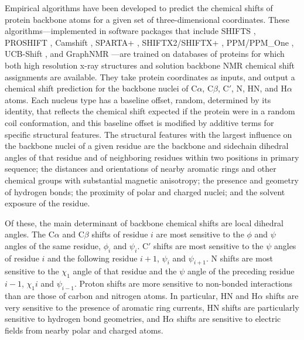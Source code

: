 \documentclass[9pt,review]{livecoms}
\begin{document}
Empirical algorithms have been developed to predict the chemical shifts of protein backbone atoms for a given set of three-dimensional coordinates.
These algorithms---implemented in software packages that include SHIFTS \cite{xu_automated_2001}, PROSHIFT \cite{meiler_proshift_2003}, Camshift \cite{kohlhoff_fast_2009}, SPARTA+ \cite{shen_sparta_2010}, SHIFTX2/SHIFTX+ \cite{han_shiftx2_2011}, PPM/PPM\_One \cite{li_ppm_2012,li_ppm_one_2015}, UCB-Shift \cite{li_accurate_2020}, and GraphNMR \cite{yang_predicting_2021}---are trained on databases of proteins for which both high resolution x-ray structures and solution backbone NMR chemical shift assignments are available.
They take protein coordinates as inputs, and output a chemical shift prediction for the backbone nuclei of C$\alpha$, C$\beta$, C$'$, N, HN, and H$\alpha$ atoms.
Each nucleus type has a baseline offset, random, determined by its identity, that reflects the chemical shift expected if the protein were in a random coil conformation, and this baseline offset is modified by additive terms for specific structural features.
The structural features with the largest influence on the backbone nuclei of a given residue are the backbone and sidechain dihedral angles of that residue and of neighboring residues within two positions in primary sequence; the distances and orientations of nearby aromatic rings and other chemical groups with substantial magnetic anisotropy; the presence and geometry of hydrogen bonds; the proximity of polar and charged nuclei; and the solvent exposure of the residue.

Of these, the main determinant of backbone chemical shifts are local dihedral angles.
The C$\alpha$ and C$\beta$ shifts of residue $i$ are most sensitive to the $\phi$ and $\psi$ angles of the same residue, $\phi_i$ and $\psi_i$.
C$'$ shifts are most sensitive to the $\psi$ angles of residue $i$ and the following residue $i+1$, $\psi_i$ and $\psi_{i+1}$.
N shifts are most sensitive to the $\chi_1$ angle of that residue and the $\psi$ angle of the preceding residue $i-1$, $\chi_1i$ and $\psi_{i-1}$.
Proton shifts are more sensitive to non-bonded interactions than are those of carbon and nitrogen atoms.
In particular, HN and H$\alpha$ shifts are very sensitive to the presence of aromatic ring currents, HN shifts are particularly sensitive to hydrogen bond geometries, and H$\alpha$ shifts are sensitive to electric fields from nearby polar and charged atoms.
\end{document}
